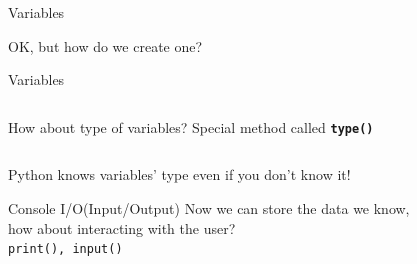 		\begin{frame}{Variables}
			\LARGE
			\begin{table}[]
			\end{table}
			\pause
			OK, but how do we create one?
		\end{frame}

		\begin{frame}{Variables}
			\inputminted[frame=single,framesep=2pt,fontsize=\LARGE]{python3}{code-examples/variables.py}
		\end{frame}
		
		\begin{frame}{How about type of variables?}
			\LARGE
			Special method called \texttt{\textbf{type()}} 
			\inputminted[frame=single,framesep=2pt]{python3}{code-examples/types.py}
			Python knows variables' type even if you don't know it!
		\end{frame}

		\begin{frame}{Console I/O(Input/Output)}
			\LARGE
			Now we can store the data we know, \\
			\pause
			how about interacting with the user? \\
			\pause
			\texttt{print(), input()}
			\pause
			\inputminted[frame=single,framesep=2pt]{python3}{code-examples/io.py}
		\end{frame}

